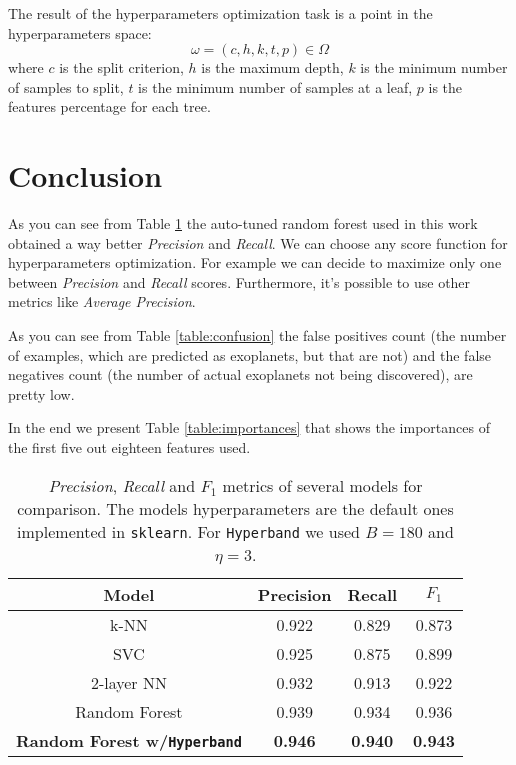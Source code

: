 \documentclass[11pt, a4paper]{article}
\begin{document}
  The result of the hyperparameters optimization task is a point in the hyperparameters space:
  \[\omega=(c, h, k, t, p)\in\Omega\]
  where $c$ is the split criterion, $h$ is the maximum depth, $k$ is the minimum number of samples to split, $t$ is the minimum number of samples at a leaf, $p$ is the features percentage for each tree.

\section{Conclusion}
  As you can see from Table \ref{table:benchmark} the auto-tuned random forest used in this work obtained a way better \textit{Precision} and \textit{Recall}. We can choose any score function for hyperparameters optimization. For example we can decide to maximize only one between \textit{Precision} and \textit{Recall} scores. Furthermore, it's possible to use other metrics like \textit{Average Precision}.
  
  As you can see from Table \ref{table:confusion} the false positives count (the number of examples, which are predicted as exoplanets, but that are not) and the false negatives count (the number of actual exoplanets not being discovered), are pretty low.

  In the end we present Table \ref{table:importances} that shows the importances of the first five out eighteen features used.

  \begin{table}
    \centering
    \begin{tabular}{|c c c c|}
      \hline
      Model & Precision & Recall & $F_{1}$  \\
      \hline\hline
      k-NN & 0.922 & 0.829 & 0.873 \\
      \hline
      SVC & 0.925 & 0.875 & 0.899 \\
      \hline
      2-layer NN & 0.932 & 0.913 & 0.922 \\
      \hline
      Random Forest & 0.939 & 0.934 & 0.936 \\
      \hline
      \textbf{Random Forest w/\texttt{Hyperband}} & \textbf{0.946} & \textbf{0.940} & \textbf{0.943} \\
      \hline
    \end{tabular}
    \caption{\textit{Precision}, \textit{Recall} and $F_{1}$ metrics of several models for comparison. The models hyperparameters are the default ones implemented in \texttt{sklearn}. For \texttt{Hyperband} we used $B=180$ and $\eta=3$.}
    \label{table:benchmark}
  \end{table}
  
\end{document}
